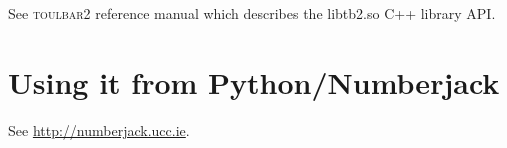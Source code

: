 \documentclass{article}
\def\toulbar2{\textsc{toulbar2}}
\begin{document}
See \toulbar2 reference manual which describes the libtb2.so C++ library API.

\section{Using it from Python/Numberjack}

See \url{http://numberjack.ucc.ie}.






\end{document}

